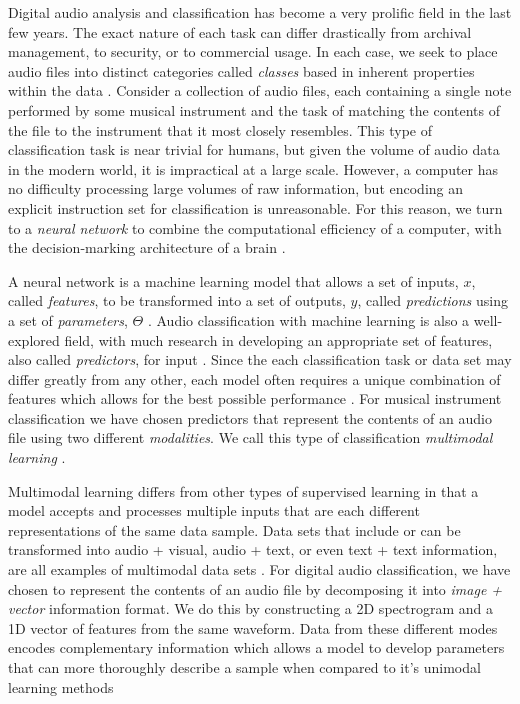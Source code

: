 \documentclass[conference,twocolumn,letterpaper]{IEEEtran}
\begin{document}
Digital audio analysis and classification has become a very prolific field in the last few years. The exact nature of each task can differ drastically from archival management, to security, or to commercial usage. In each case, we seek to place audio files into distinct categories called \textit{classes} based in inherent properties within the data \cite{James,Khan,Liu}. Consider a collection of audio files, each containing a single note performed by some musical instrument and the task of matching the contents of the file to the instrument that it most closely resembles. This type of classification task is near trivial for humans, but given the volume of audio data in the modern world, it is impractical at a large scale. However, a computer has no difficulty processing large volumes of raw information, but encoding an explicit instruction set for classification is unreasonable. For this reason, we turn to a \textit{neural network} to combine the computational efficiency of a computer, with the decision-marking architecture of a brain \cite{Geron}. 

A neural network is a machine learning model that allows a set of inputs, $x$, called \textit{features}, to be transformed into a set of outputs, $y$,  called \textit{predictions} using a set of \textit{parameters}, $\Theta$ \cite{Geron,Goodfellow,Virtanen}. Audio classification with machine learning is also a well-explored field, with much research in developing an appropriate set of features, also called \textit{predictors}, for input \cite{James,Liu,Mierswa,Zhang}. Since the each classification task or data set may differ greatly from any other, each model often requires a unique combination of features which allows for the best possible performance \cite{Virtanen}. For musical instrument classification we have chosen predictors that represent the contents of an audio file using two different \textit{modalities}. We call this type of classification \textit{multimodal learning} \cite{Ngiam}.

Multimodal learning differs from other types of supervised learning in that a model accepts and processes multiple inputs that are each different representations of the same data sample. Data sets that include or can be transformed into audio + visual, audio + text, or even text + text information, are all examples of multimodal data sets \cite{Li}. For digital audio classification, we have chosen to represent the contents of an audio file by decomposing it into \textit{image + vector} information format. We do this by constructing a 2D spectrogram and a 1D vector of features from the same waveform. Data from these different modes encodes complementary information which allows a model to develop parameters that can more thoroughly describe a sample when compared to it's unimodal learning methods \cite{Li}
\end{document}
